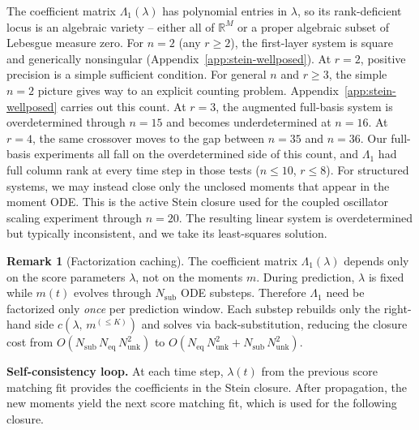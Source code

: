 \documentclass{article}
\newcommand{\R}{\mathbb{R}}
\theoremstyle{definition}
\newtheorem{remark}{Remark}
\begin{document}
The coefficient matrix $\Lambda_1(\lambda)$ has polynomial entries in $\lambda$,
so its rank-deficient locus is an algebraic variety -- either all of $\R^M$
or a proper algebraic subset of Lebesgue measure zero.
For $n{=}2$ (any $r \ge 2$), the first-layer system is square and generically
nonsingular (Appendix~\ref{app:stein-wellposed}). At $r=2$, positive
precision is a simple sufficient condition.
For general $n$ and $r \ge 3$, the simple $n{=}2$ picture gives way
to an explicit counting problem.
Appendix~\ref{app:stein-wellposed} carries out this count.
At $r{=}3$, the augmented full-basis system is overdetermined through
$n{=}15$ and becomes underdetermined at $n{=}16$.
At $r{=}4$, the same crossover moves to the gap between $n{=}35$ and
$n{=}36$.
Our full-basis experiments all fall on the overdetermined side of this
count, and $\Lambda_1$ had full column rank at every time step in those tests
($n \le 10$, $r \le 8$).
For structured systems, we may instead close only the unclosed moments
that appear in the moment ODE. This is the active Stein closure used
for the coupled oscillator scaling experiment through $n{=}20$.
The resulting linear system is overdetermined but typically inconsistent,
and we take its least-squares solution.

\begin{remark}[Factorization caching]\label{rem:factor-cache}
The coefficient matrix $\Lambda_1(\lambda)$ depends only on the score
parameters $\lambda$, not on the moments $m$.
During prediction, $\lambda$ is fixed while $m(t)$ evolves through
$N_{\mathrm{sub}}$ ODE substeps.
Therefore $\Lambda_1$ need be factorized only \emph{once} per prediction
window.
Each substep rebuilds only the right-hand side
$c(\lambda,\, m^{(\le K)})$ and solves via back-substitution,
reducing the closure cost from
$O(N_{\mathrm{sub}}\, N_{\mathrm{eq}}\, N_{\mathrm{unk}}^2)$ to
$O(N_{\mathrm{eq}}\, N_{\mathrm{unk}}^2 + N_{\mathrm{sub}}\, N_{\mathrm{unk}}^2)$.
\end{remark}

\textbf{Self-consistency loop.} At each time step,
$\lambda(t)$ from the previous score matching fit provides the
coefficients in the Stein closure.
After propagation, the new moments yield the next score matching fit,
which is used for the following closure.
\end{document}
